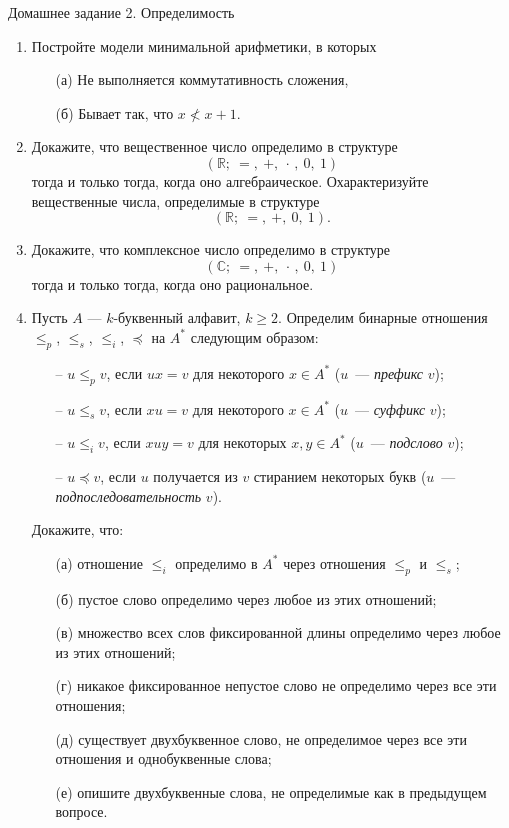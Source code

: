 \documentclass[a4paper,11pt]{article}
\begin{document}
\begin{center}
	\Large Домашнее задание 2. Определимость
\end{center}

\begin{enumerate}
	\item Постройте модели минимальной арифметики, в которых
	\begin{enumerate}
	   \item[(а)] Не выполняется коммутативность сложения,
	   \item[(б)] Бывает так, что \(x \not< x+1\).
	\end{enumerate}

	\item Докажите, что вещественное число определимо в структуре
		\[ (\mathbb{R};\ =,\ +,\ \cdot\, ,\ 0,\ 1)\]
	тогда и только тогда, когда оно алгебраическое. Охарактеризуйте вещественные числа, определимые в структуре
		\[ (\mathbb{R};\ =,\ +,\ 0,\ 1).\]

	\item Докажите, что комплексное число определимо в структуре
		\[ (\mathbb{C};\ =,\ +,\ \cdot\, ,\ 0,\ 1)\]
	тогда и только тогда, когда оно рациональное.

	\item Пусть $A$ --- $k$-буквенный алфавит, $k\geq2$. Определим бинарные отношения $\leq_p$, $\leq_s$, $\leq_i$, $\preceq$  на $A^*$ следующим образом:

	\begin{enumerate}
	   \item[–] $u\leq_pv$, если $ux=v$ для некоторого $x\in A^*$ (\(u\)~— {\it префикс} \(v\));
	   \item[–] $u\leq_sv$, если $xu=v$ для некоторого $x\in A^*$ (\(u\)~— {\it суффикс} \(v\));
	   \item[–] $u\leq_iv$, если $xuy=v$ для некоторых $x,y\in A^*$ (\(u\)~— {\it подслово} \(v\));
	   \item[–] $u\preceq v$, если $u$ получается из $v$ стиранием некоторых букв (\(u\)~— {\it подпоследовательность} \(v\)).
	\end{enumerate}

Докажите, что: 

\begin{enumerate}
	   \item[(а)] отношение $\leq_i$ определимо в $A^*$ через отношения  $\leq_p$ и $\leq_s$; 
	   \item[(б)]пустое слово определимо через любое из этих отношений; 
	   \item[(в)]множество всех слов фиксированной длины определимо через любое из этих отношений; 
	   \item[(г)]никакое фиксированное непустое слово не определимо через все эти отношения; 
	   \item[(д)]существует двухбуквенное слово, не определимое через все эти отношения и однобуквенные слова; 
	   \item[(е)] опишите  двухбуквенные слова, не определимые как в предыдущем вопросе.
\end{enumerate}


\end{enumerate}
\end{document}
